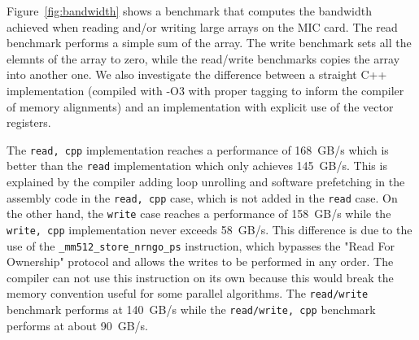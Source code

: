 \documentclass{sig-alternate}
\def\ge#1{{#1}}
\begin{document}
Figure~\ref{fig:bandwidth} shows a benchmark that computes the
bandwidth achieved when reading and/or writing large arrays on 
the MIC card. The read benchmark performs a
simple sum of the array. The write benchmark sets all the elemnts of
the array to zero, while the read/write benchmarks copies the array into
another one. We also investigate the difference between a straight C++
implementation (compiled with \mbox{-O3} with proper tagging to inform the
compiler of memory alignments) and an implementation with
explicit use of the vector registers.

The {\tt read, cpp} implementation reaches a performance of 168~GB/s
 which is better than the {\tt read}
implementation which only achieves 145~GB/s. This
is explained by the compiler adding loop unrolling and software
prefetching in the assembly code in the {\tt read, cpp} case, which is
not added in the {\tt read} case. On the other hand, the {\tt write}
case reaches a performance of 158~GB/s while the
{\tt write, cpp} implementation never exceeds 58~GB/s. 
This difference is due to the use of the {\tt \_mm512\_store\_nrngo\_ps} instruction, 
which bypasses the \ge{"Read For Ownership"} protocol and allows the writes
to be performed in any order. The compiler can not use this
instruction on its own because this would break the memory convention
useful for some parallel algorithms. The {\tt read/write} benchmark
performs at 140~GB/s while the {\tt read/write, cpp} benchmark performs
at about 90~GB/s.
\end{document}
